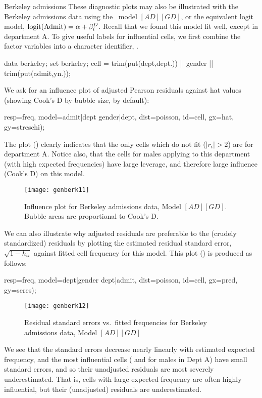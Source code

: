 \begin{Example}[berkeley9]{Berkeley admissions}
These diagnostic plots may also be illustrated
with the Berkeley admissions
data using the \loglin\ model $[AD] [GD]$,
or the equivalent logit model, $\logit(\mbox{Admit}) = \alpha + \beta_i^{D}$.
Recall that we found this model fit well, except in department A.
To give useful labels for influential cells, we first combine the
factor variables into a character identifier, .
\begin{listing}
data berkeley;
   set berkeley;
   cell = trim(put(dept,dept.)) ||
          gender ||
          trim(put(admit,yn.));
\end{listing}
We ask for an influence plot of adjusted Pearson residuals against hat values
(showing Cook's D by bubble size, by default):
\begin{listing}
        resp=freq, model=admit|dept gender|dept, dist=poisson, id=cell,
        gx=hat, gy=streschi);
\end{listing}
The plot () clearly indicates that the only cells
which do not fit ($|r_i| > 2$) are for department A.
Notice also, that the cells for males applying to this department
(with high expected frequencies)
have large leverage, and therefore large influence (Cook's D)
on this model.
\begin{figure}[htb]
  \centering
  \texttt{[image: genberk11]}
  \caption[Influence plot for Berkeley admissions data, Model AD GD]{Influence plot for Berkeley admissions data, Model $[AD] [GD]$.
  Bubble areas are proportional to Cook's D.}%
  \label{fig:genberk11}
\end{figure}

We can also illustrate why adjusted residuals are preferable to
the (crudely standardized) residuals by plotting the estimated
residual standard error, $\sqrt{1-h_{ii}}$ against fitted cell
frequency for this model.
This plot () is produced as follows:
\begin{listing}
        resp=freq, model=dept|gender dept|admit, dist=poisson, id=cell,
        gx=pred, gy=seres);
\end{listing}

\begin{figure}[htb]
  \centering
  \texttt{[image: genberk12]}
  \caption[Residual standard errors vs.\ fitted frequencies]{Residual standard errors vs.\ fitted frequencies for Berkeley admissions data, Model $[AD] [GD]$}%
  \label{fig:genberk12}
\end{figure}
We see that the standard errors decrease nearly linearly
with estimated expected frequency,
and the most influential cells ( and  for
males in Dept A)  have small standard errors,
and so their unadjusted residuals are most severely underestimated.
That is, cells with large expected frequency are
often highly influential, but their (unadjusted) residuals are
underestimated. 


\end{Example}
